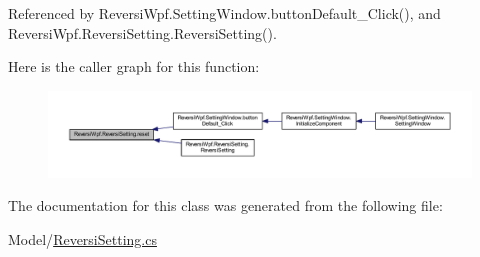 Referenced by Reversi\+Wpf.\+Setting\+Window.\+button\+Default\+\_\+\+Click(), and Reversi\+Wpf.\+Reversi\+Setting.\+Reversi\+Setting().

Here is the caller graph for this function\+:
\nopagebreak
\begin{figure}[H]
\begin{center}
\leavevmode
\includegraphics[width=350pt]{class_reversi_wpf_1_1_reversi_setting_abfa8cacbb6a45668ed099a9a8360bdff_icgraph}
\end{center}
\end{figure}


The documentation for this class was generated from the following file\+:\begin{DoxyCompactItemize}
\item 
Model/\hyperlink{_reversi_setting_8cs}{Reversi\+Setting.\+cs}\end{DoxyCompactItemize}
